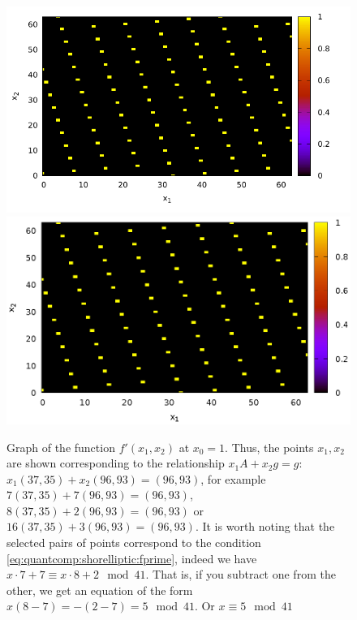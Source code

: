 \begin{figure}
\centering

\ifpdf
\includegraphics[angle=0]
{elliptic/picellipticdiscretlog1.pdf}
\else
\includegraphics[angle=0]
{elliptic/picellipticdiscretlog1.eps}
\fi

%




\caption{Graph of the function 
$f'(x_1, x_2)$ at $x_0 = 1$. Thus, the points $x_1, x_2$ are shown
  corresponding to the relationship $x_1 A + x_2 g = g$: 
  $x_1 (37, 35) + x_2 (96,93) = (96,93)$, for example
  $7 (37, 35) + 7 (96,93) = (96,93)$, $8 (37, 35) + 2 (96,93) =
  (96,93)$ or $16 (37, 35) + 3 (96,93) =
  (96,93)$. It is worth noting that the selected pairs of points correspond
  to the condition \eqref{eq:quantcomp:shorelliptic:fprime}, indeed
 we have $x \cdot 7 + 7 \equiv x \cdot 8 + 2 \mod 41$. 
 That is, if you subtract one from the other, we
 get an equation of the form $x \left(8-7\right) = - (2 - 7) = 5 \mod 41$.
 Or $x \equiv 5 \mod 41$} 
\label{fig:quantcomp:dle1}
\end{figure}
